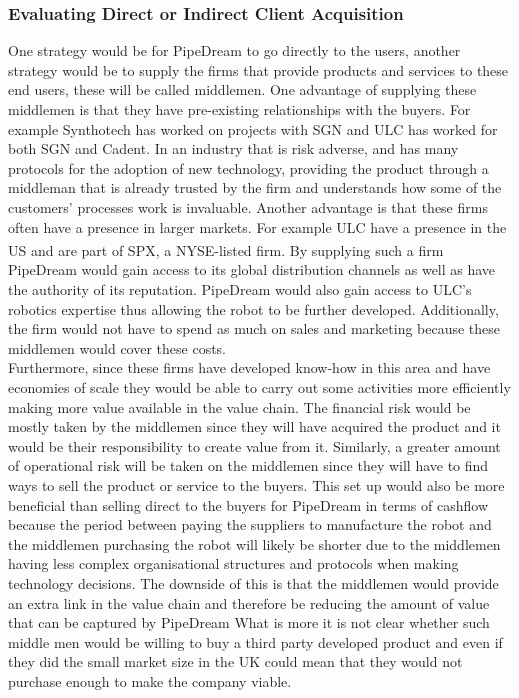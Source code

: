 \documentclass[11pt]{article}		%
\newcommand{\supercite}[1]{\textsuperscript{\cite{#1}}}		%
\begin{document}
    \subsubsection{Evaluating Direct or Indirect Client Acquisition}
            One strategy would be for PipeDream to go directly to the users, another strategy would be to supply the firms that provide products and services to these end users, these will be called middlemen.
           One advantage of supplying these middlemen is that they have pre-existing relationships with the buyers. For example Synthotech has worked on projects with SGN and ULC has worked for both SGN and Cadent. In an industry that is risk adverse, and has many protocols for the adoption of new technology, providing the product through a middleman that is already trusted by the firm and understands how some of the customers’ processes work is invaluable. Another advantage is that these firms often have a presence in larger markets. For example ULC have a presence in the US and are part of SPX, a NYSE-listed firm.\supercite{SPX_acquisition} By supplying such a firm PipeDream would gain access to its global distribution channels as well as have the authority of its reputation. PipeDream would also gain access to ULC’s robotics expertise thus allowing the robot to be further developed. Additionally, the firm would not have to spend as much on sales and marketing because these middlemen would cover these costs.
            \\
            Furthermore, since these firms have developed know-how in this area and have economies of scale they would be able to carry out some activities more efficiently making more value available in the value chain. The financial risk would be mostly taken by the middlemen since they will have acquired the product and it would be their responsibility to create value from it. Similarly, a greater amount of operational risk will be taken on the middlemen since they will have to find ways to sell the product or service to the buyers. This set up would also be more beneficial than selling direct to the buyers for PipeDream in terms of cashflow because the period between paying the suppliers to manufacture the robot and the middlemen purchasing the robot will likely be shorter due to the middlemen having less complex organisational structures and protocols when making technology decisions. The downside of this is that the middlemen would provide an extra link in the value chain and therefore be reducing the amount of value that can be captured by PipeDream What is more it is not clear whether such middle men would be willing to buy a third party developed product and even if they did the small market size in the UK could mean that they would not purchase enough to make the company viable. 
\end{document}
